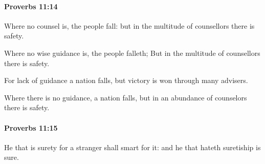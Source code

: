 		\paragraph{Proverbs 11:14} %
			\label{PROVERBS-11-14}

			Where no counsel is, the people fall: but in the multitude of counsellors there is safety.

			\begin{versebox}
					\item[BHS] 
					\item[ASV] Where no wise guidance is, the people falleth; But in the multitude of counsellors there is safety.
					\item[NIV] For lack of guidance a nation falls, but victory is won through many advisers.
					\item[NRSV] Where there is no guidance, a nation falls, but in an abundance of counselors there is safety.
			\end{versebox}

		\paragraph{Proverbs 11:15} %
			\label{PROVERBS-11-15}

			He that is surety for a stranger shall smart for it: and he that hateth suretiship is sure.

